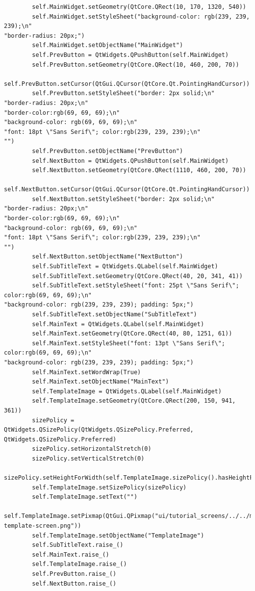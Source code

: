 \documentclass{article}
\begin{document}
\begin{lstlisting}
        self.MainWidget.setGeometry(QtCore.QRect(10, 170, 1320, 540))
        self.MainWidget.setStyleSheet("background-color: rgb(239, 239, 239);\n"
"border-radius: 20px;")
        self.MainWidget.setObjectName("MainWidget")
        self.PrevButton = QtWidgets.QPushButton(self.MainWidget)
        self.PrevButton.setGeometry(QtCore.QRect(10, 460, 200, 70))
        self.PrevButton.setCursor(QtGui.QCursor(QtCore.Qt.PointingHandCursor))
        self.PrevButton.setStyleSheet("border: 2px solid;\n"
"border-radius: 20px;\n"
"border-color:rgb(69, 69, 69);\n"
"background-color: rgb(69, 69, 69);\n"
"font: 18pt \"Sans Serif\"; color:rgb(239, 239, 239);\n"
"")
        self.PrevButton.setObjectName("PrevButton")
        self.NextButton = QtWidgets.QPushButton(self.MainWidget)
        self.NextButton.setGeometry(QtCore.QRect(1110, 460, 200, 70))
        self.NextButton.setCursor(QtGui.QCursor(QtCore.Qt.PointingHandCursor))
        self.NextButton.setStyleSheet("border: 2px solid;\n"
"border-radius: 20px;\n"
"border-color:rgb(69, 69, 69);\n"
"background-color: rgb(69, 69, 69);\n"
"font: 18pt \"Sans Serif\"; color:rgb(239, 239, 239);\n"
"")
        self.NextButton.setObjectName("NextButton")
        self.SubTitleText = QtWidgets.QLabel(self.MainWidget)
        self.SubTitleText.setGeometry(QtCore.QRect(40, 20, 341, 41))
        self.SubTitleText.setStyleSheet("font: 25pt \"Sans Serif\"; color:rgb(69, 69, 69);\n"
"background-color: rgb(239, 239, 239); padding: 5px;")
        self.SubTitleText.setObjectName("SubTitleText")
        self.MainText = QtWidgets.QLabel(self.MainWidget)
        self.MainText.setGeometry(QtCore.QRect(40, 80, 1251, 61))
        self.MainText.setStyleSheet("font: 13pt \"Sans Serif\"; color:rgb(69, 69, 69);\n"
"background-color: rgb(239, 239, 239); padding: 5px;")
        self.MainText.setWordWrap(True)
        self.MainText.setObjectName("MainText")
        self.TemplateImage = QtWidgets.QLabel(self.MainWidget)
        self.TemplateImage.setGeometry(QtCore.QRect(200, 150, 941, 361))
        sizePolicy = QtWidgets.QSizePolicy(QtWidgets.QSizePolicy.Preferred, QtWidgets.QSizePolicy.Preferred)
        sizePolicy.setHorizontalStretch(0)
        sizePolicy.setVerticalStretch(0)
        sizePolicy.setHeightForWidth(self.TemplateImage.sizePolicy().hasHeightForWidth())
        self.TemplateImage.setSizePolicy(sizePolicy)
        self.TemplateImage.setText("")
        self.TemplateImage.setPixmap(QtGui.QPixmap("ui/tutorial_screens/../../media/annotated-template-screen.png"))
        self.TemplateImage.setObjectName("TemplateImage")
        self.SubTitleText.raise_()
        self.MainText.raise_()
        self.TemplateImage.raise_()
        self.PrevButton.raise_()
        self.NextButton.raise_()


\end{lstlisting}
\end{document}
